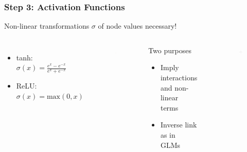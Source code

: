 \begin{frame}
	\frametitle{Step 3: Activation Functions}
	Non-linear transformations $\sigma$ of node values necessary!
	\begin{columns}[onlytextwidth]
		\begin{itemize}
			\item tanh: $\sigma(x) = \frac{e^x - e^{-x}}{e^x + e^{-x}}$
			\item ReLU: $\sigma(x) = \text{max}(0, x)$
		\end{itemize}
		\begin{figure}
			\includegraphics[width=0.8\textwidth]{pics/activation_functions.png}
		\end{figure}
		\begin{block}{Two purposes}
			\begin{itemize}
				\item Imply interactions and non-linear terms
				\item Inverse link as in GLMs
			\end{itemize}
		\end{block}
		\begin{example}
		\end{example}
		\begin{figure}
			\includegraphics[width=0.98\textwidth]{../figs/nn_activation.png}
		\end{figure}
	\end{columns}
\end{frame}

